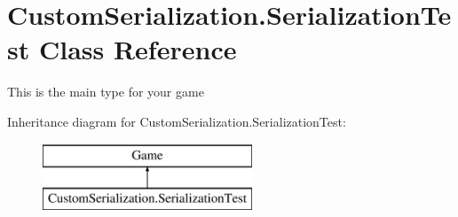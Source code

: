 \hypertarget{class_custom_serialization_1_1_serialization_test}{\section{Custom\-Serialization.\-Serialization\-Test Class Reference}
\label{d8/d72/class_custom_serialization_1_1_serialization_test}
}


This is the main type for your game  


Inheritance diagram for Custom\-Serialization.\-Serialization\-Test\-:\begin{figure}[H]
\begin{center}
\leavevmode
\includegraphics[height=2.000000cm]{d8/d72/class_custom_serialization_1_1_serialization_test}
\end{center}
\end{figure}
